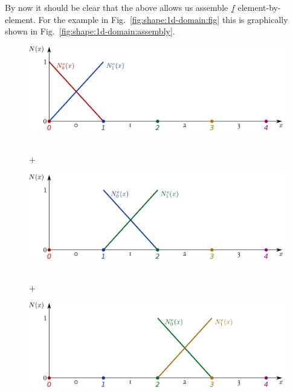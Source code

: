 \documentclass[times,namecite]{goose-article}
\begin{document}
By now it should be clear that the above allows us assemble $\underline{f}$ element-by-element. For the example in Fig.~\ref{fig:shape:1d-domain:fig} this is graphically shown in Fig.~\ref{fig:shape:1d-domain:assembly}.

\begin{figure}[htp]
  \centering
  \captionsetup[subfigure]{justification=centering}
  \begin{minipage}[t]{.5\textwidth}
    \centering
    \includegraphics[width=1.\textwidth]{figures/shape-functions-1d-element-0.pdf}
  \end{minipage}
  \\
  $+$
  \\
  \begin{minipage}[t]{.5\textwidth}
    \centering
    \includegraphics[width=1.\textwidth]{figures/shape-functions-1d-element-1.pdf}
  \end{minipage}
  \\
  $+$
  \\
  \begin{minipage}[t]{.5\textwidth}
    \centering
    \includegraphics[width=1.\textwidth]{figures/shape-functions-1d-element-2.pdf}
  \end{minipage}

\end{figure}
\end{document}
